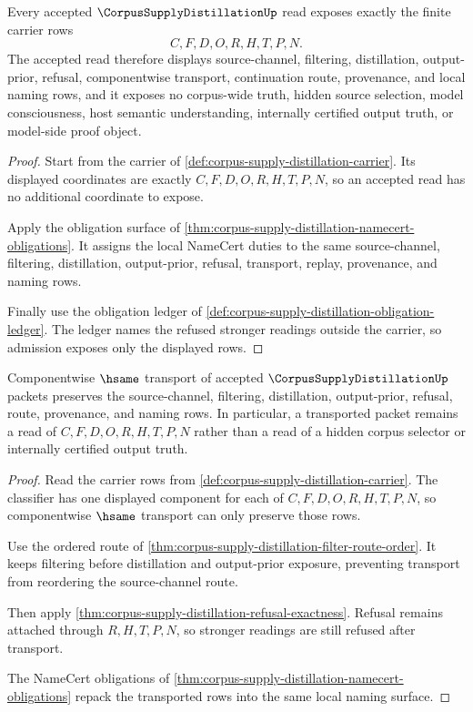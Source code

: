 \begin{theorem}
\label{thm:corpus-supply-distillation-carrier-admission}
Every accepted $\CorpusSupplyDistillationUp$ read exposes exactly the finite carrier rows
$$
C,F,D,O,R,H,T,P,N.
$$
The accepted read therefore displays source-channel, filtering, distillation, output-prior, refusal, componentwise transport, continuation route, provenance, and local naming rows, and it exposes no corpus-wide truth, hidden source selection, model consciousness, host semantic understanding, internally certified output truth, or model-side proof object.
\end{theorem}
\begin{proof}
Start from the carrier of \autoref{def:corpus-supply-distillation-carrier}. Its displayed coordinates are exactly $C,F,D,O,R,H,T,P,N$, so an accepted read has no additional coordinate to expose.

Apply the obligation surface of \autoref{thm:corpus-supply-distillation-namecert-obligations}. It assigns the local NameCert duties to the same source-channel, filtering, distillation, output-prior, refusal, transport, replay, provenance, and naming rows.

Finally use the obligation ledger of \autoref{def:corpus-supply-distillation-obligation-ledger}. The ledger names the refused stronger readings outside the carrier, so admission exposes only the displayed rows.
\end{proof}

\begin{theorem}
\label{thm:corpus-supply-distillation-classifier-stability}
Componentwise $\hsame$ transport of accepted $\CorpusSupplyDistillationUp$ packets preserves the source-channel, filtering, distillation, output-prior, refusal, route, provenance, and naming rows. In particular, a transported packet remains a read of $C,F,D,O,R,H,T,P,N$ rather than a read of a hidden corpus selector or internally certified output truth.
\end{theorem}
\begin{proof}
Read the carrier rows from \autoref{def:corpus-supply-distillation-carrier}. The classifier has one displayed component for each of $C,F,D,O,R,H,T,P,N$, so componentwise $\hsame$ transport can only preserve those rows.

Use the ordered route of \autoref{thm:corpus-supply-distillation-filter-route-order}. It keeps filtering before distillation and output-prior exposure, preventing transport from reordering the source-channel route.

Then apply \autoref{thm:corpus-supply-distillation-refusal-exactness}. Refusal remains attached through $R,H,T,P,N$, so stronger readings are still refused after transport.

The NameCert obligations of \autoref{thm:corpus-supply-distillation-namecert-obligations} repack the transported rows into the same local naming surface.
\end{proof}


